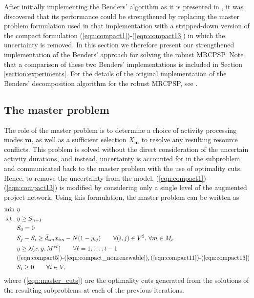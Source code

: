\documentclass[a4paper,abstracton]{scrartcl}
\begin{document}
After initially implementing the Benders' algorithm as it is presented in \cite{balouka2021robust}, it was discovered that its performance could be strengthened by replacing the master problem formulation used in that implementation with a stripped-down version of the compact formulation (\ref{eqn:compact1})-(\ref{eqn:compact13}) in which the uncertainty is removed. In this section we therefore present our strengthened implementation of the Benders' approach for solving the robust MRCPSP. Note that a comparison of these two Benders' implementations is included in Section \ref{section:experiments}. For the details of the original implementation of the Benders' decomposition algorithm for the robust MRCPSP, see \cite{balouka2021robust}.

\subsection{The master problem}

The role of the master problem is to determine a choice of activity processing modes $\bm{m}$, as well as a sufficient selection $X_{\bm{m}}$ to resolve any resulting resource conflicts. This problem is solved without the direct consideration of the uncertain activity durations, and instead, uncertainty is accounted for in the subproblem and communicated back to the master problem with the use of optimality cuts. Hence, to remove the uncertainty from the model, (\ref{eqn:compact1})-(\ref{eqn:compact13}) is modified by considering only a single level of the augmented project network. Using this formulation, the master problem can be written as
\begin{align}
\min \ & \eta\label{eqn:master_first}\\
\text{s.t. } & \eta \geq S_{n+1}\\
	     & S_{0}=0\label{eqn:master2}\\
	     & S_{j} - S_{i} \geq \bar{d}_{im}x_{im} - N(1-y_{ij}) \qquad \forall (i,j)\in V^2,\,\forall m\in M_i\label{eqn:master3}\\
	     & \eta \geq \lambda(x, y, M^{*\ell}) \qquad \forall \ell=1,\dots,t-1\label{eqn:master_cuts}\\
	     & \textnormal{(\ref{eqn:compact5})-(\ref{eqn:compact_nonrenewable}),\,(\ref{eqn:compact11})-(\ref{eqn:compact13})}\\
	     & S_i\geq 0 \qquad \forall i\in V,\label{eqn:master_last}
\end{align}
where (\ref{eqn:master_cuts}) are the optimality cuts generated from the solutions of the resulting subproblems at each of the previous iterations.
\end{document}
